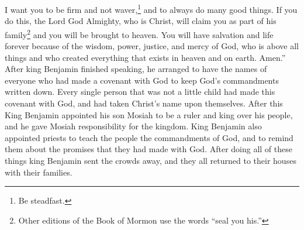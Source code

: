 \bverse \iffalse Therefore, I would that ye should be steadfast and immovable, always abounding in good works, that Christ, the Lord God Omnipotent, may seal you his, that you may be brought to heaven, that ye may have everlasting salvation and eternal life, through the wisdom, and power, and justice, and mercy of him who created all things, in heaven and in earth, who is God above all. Amen. \fi
I want you to be firm and not waver,\footnote{Be steadfast.} and to always do many good things. If you do this, the Lord God Almighty, who is Christ, will claim you as part of his family\footnote{Other editions of the Book of Mormon use the words ``seal you his.''} and you will be brought to heaven. You will have salvation and life forever because of the wisdom, power, justice, and mercy of God, who is above all things and who created everything that exists in heaven and on earth. Amen.''
\bchapter
\bverse \iffalse And now, king Benjamin thought it was expedient, after having finished speaking to the people, that he should take the names of all those who had entered into a covenant with God to keep his commandments. \fi
After king Benjamin finished speaking, he arranged to have the names of everyone who had made a covenant with God to keep God's commandments written down.
\bverse \iffalse And it came to pass that there was not one soul, except it were little children, but who had entered into the covenant and had taken upon them the name of Christ. \fi
Every single person that was not a little child had made this covenant with God, and had taken Christ's name upon themselves.
\bverse \iffalse And again, it came to pass that when king Benjamin had made an end of all these things, and had consecrated his son Mosiah to be a ruler and a king over his people, and had given him all the charges concerning the kingdom, and also had appointed priests to teach the people, that thereby they might hear and know the commandments of God, and to stir them up in remembrance of the oath which they had made, he dismissed the multitude, and they returned, every one, according to their families, to their own houses. \fi
After this King Benjamin appointed his son Mosiah to be a ruler and king over his people, and he gave Mosiah responsibility for the kingdom. King Benjamin also appointed priests to teach the people the commandments of God, and to remind them about the promises that they had made with God. After doing all of these things king Benjamin sent the crowds away, and they all returned to their houses with their families.
